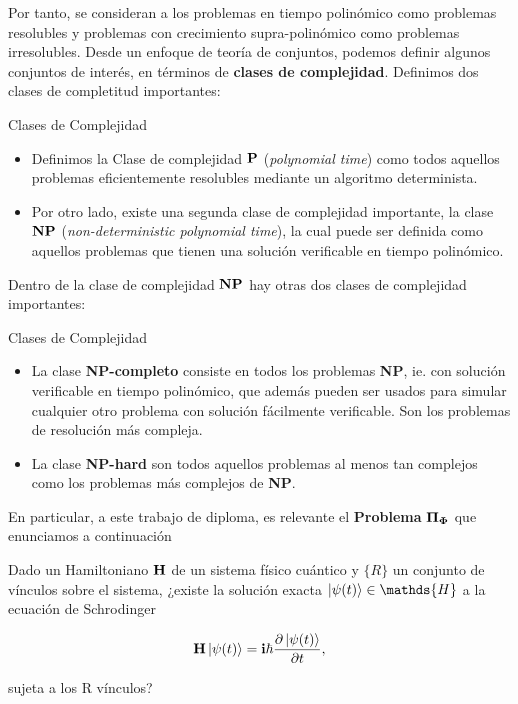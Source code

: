 \documentclass{report} %
\numberwithin{equation}{section}
\begin{document}
Por tanto, se consideran a los problemas en tiempo polinómico como problemas resolubles y problemas con crecimiento supra-polinómico como problemas irresolubles. Desde un enfoque de teoría de conjuntos, podemos definir algunos conjuntos de interés, en términos de \textbf{clases de complejidad}. Definimos dos clases de completitud importantes: 

\begin{tcolorbox}{Clases de Complejidad}

\begin{itemize}
    \item Definimos la Clase de complejidad ${\bf P}$ (\textit{polynomial time}) como todos aquellos problemas eficientemente resolubles mediante un algoritmo determinista. 
    \item Por otro lado, existe una segunda clase de complejidad importante, la clase ${\bf NP}$ (\textit{non-deterministic polynomial time}), la cual puede ser definida como aquellos problemas que tienen una solución verificable en tiempo polinómico.
\end{itemize}
\end{tcolorbox}

Dentro de la clase de complejidad ${\bf NP}$ hay otras dos clases de complejidad importantes: 

\begin{tcolorbox}{Clases de Complejidad}

\begin{itemize}
    \item La clase \textbf{NP-completo} consiste en todos los problemas \textbf{NP}, ie. con solución verificable en tiempo polinómico, que además pueden ser usados para simular cualquier otro problema con solución fácilmente verificable. Son los problemas de resolución más compleja.
    \item La clase \textbf{NP-hard} son todos aquellos problemas al menos tan complejos como los problemas más complejos de \textbf{NP}.
\end{itemize}
\end{tcolorbox}

\textnormal{  } \newline

En particular, a este trabajo de diploma, es relevante el \textbf{Problema} ${\bf \Pi_{\Phi}}$ que enunciamos a continuación

\begin{tcolorbox}[colback=red!5!white, colframe=red!50!black, title= \textbf{Problema} ${\bf \Pi_{\Phi}}$ ]

Dado un Hamiltoniano ${\bf H}$ de un sistema físico cuántico y $\{R\}$ un conjunto de vínculos sobre el sistema, ¿existe la solución exacta $\ket{\psi(t)} \in \mathds{H}$ a la ecuación de Schrodinger 

$$
{\bf H} \ket{\psi(t)} = {\bf i} \hbar \frac{\partial\ket{\psi(t)}}{\partial t},
$$

sujeta a los R vínculos?
\end{tcolorbox}
\end{document}
